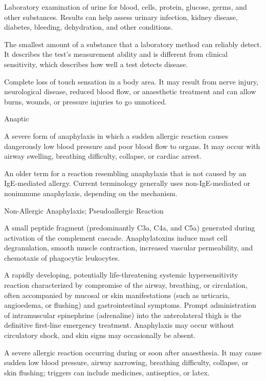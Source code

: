  Laboratory examination of urine for blood, cells, protein, glucose, germs, and other substances. Results can help assess urinary infection, kidney disease, diabetes, bleeding, dehydration, and other conditions.

 The smallest amount of a substance that a laboratory method can reliably detect. It describes the test’s measurement ability and is different from clinical sensitivity, which describes how well a test detects disease.

 Complete loss of touch sensation in a body area. It may result from nerve injury, neurological disease, reduced blood flow, or anaesthetic treatment and can allow burns, wounds, or pressure injuries to go unnoticed.

\synonyms
Anaptic

 A severe form of anaphylaxis in which a sudden allergic reaction causes dangerously low blood pressure and poor blood flow to organs. It may occur with airway swelling, breathing difficulty, collapse, or cardiac arrest.

 An older term for a reaction resembling anaphylaxis that is not caused by an IgE-mediated allergy. Current terminology generally uses non-IgE-mediated or nonimmune anaphylaxis, depending on the mechanism.

\synonyms
Non-Allergic Anaphylaxis; Pseudoallergic Reaction

 A small peptide fragment (predominantly C3a, C4a, and C5a) generated during activation of the complement cascade. Anaphylatoxins induce mast cell degranulation, smooth muscle contraction, increased vascular permeability, and chemotaxis of phagocytic leukocytes.

 A rapidly developing, potentially life-threatening systemic hypersensitivity reaction characterized by compromise of the airway, breathing, or circulation, often accompanied by mucosal or skin manifestations (such as urticaria, angioedema, or flushing) and gastrointestinal symptoms. Prompt administration of intramuscular epinephrine (adrenaline) into the anterolateral thigh is the definitive first-line emergency treatment. Anaphylaxis may occur without circulatory shock, and skin signs may occasionally be absent.

 A severe allergic reaction occurring during or soon after anaesthesia. It may cause sudden low blood pressure, airway narrowing, breathing difficulty, collapse, or skin flushing; triggers can include medicines, antiseptics, or latex.

